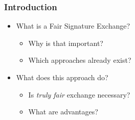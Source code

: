 \begin{frame}
	\frametitle{Introduction}

	\begin{itemize}
		\setlength\itemsep{1em}
		\item What is a Fair Signature Exchange?
			\begin{itemize}
				\item Why is that important?
				\item Which approaches already exist?
			\end{itemize}
		\item What does this approach do?
			\begin{itemize}
				\item Is \textit{truly fair} exchange necessary?
				\item What are advantages?
			\end{itemize}
	\end{itemize}
\end{frame}